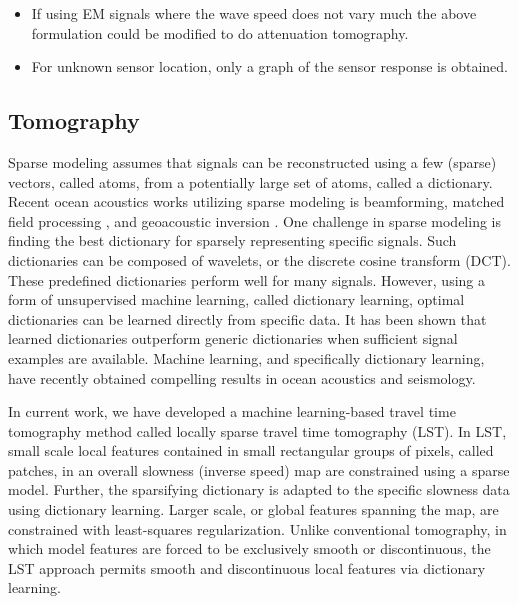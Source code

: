 \begin{itemize}
\item If using EM signals where the wave speed does not vary much the above formulation could be modified to do attenuation tomography.

\item For unknown sensor location, only a graph of the sensor response is obtained. 
\end{itemize}
\subsection{Tomography}
Sparse modeling assumes that signals can be reconstructed using a few (sparse) vectors, called atoms, from a potentially large set of atoms, called a dictionary. Recent ocean acoustics works utilizing sparse modeling is beamforming\cite{Xenaki2014}, matched field processing \cite{Gemba2017}, and geoacoustic inversion \cite{gerstoft2018}. One challenge in sparse modeling is finding the best dictionary for sparsely representing specific signals. Such dictionaries can be composed of wavelets, or the discrete cosine transform (DCT). These predefined dictionaries perform well for many signals. However, using a form of unsupervised machine learning, called dictionary learning, optimal dictionaries can be learned directly from specific data\cite{mallat1999}. It has been shown that learned dictionaries outperform generic dictionaries when sufficient signal examples are available. Machine learning, and specifically dictionary learning, have recently obtained compelling results in ocean acoustics \cite{Bianco2017} and seismology\cite{kong2018}. 

In current work, we have developed a machine learning-based travel time tomography method called locally sparse travel time tomography (LST)\cite{bianco2018}. In LST, small scale local features contained in small rectangular groups of pixels, called patches, in an overall slowness (inverse  speed) map are constrained using a sparse model. Further, the sparsifying dictionary is adapted to the specific slowness data using dictionary learning. Larger scale, or global features spanning the  map, are constrained with least-squares regularization. Unlike conventional tomography, in which model features are forced to be exclusively smooth or discontinuous, the LST approach permits smooth and discontinuous local features via dictionary learning. 


